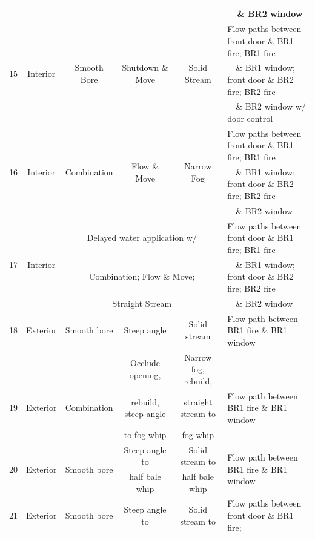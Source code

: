 \documentclass[12pt,oneside]{book}
\begin{document}
\begin{table}[!ht]
{\begin{tabular}{|c|c|c|c|c|l|}
					& 							& 								& 									& 									& ~~\& BR2 window \\
\hline
\multirow{3}{*}{15}	& \multirow{3}{*}{Interior} & \multirow{3}{*}{Smooth Bore} 	& \multirow{3}{*}{Shutdown \& Move}	& \multirow{3}{*}{Solid Stream} 	& Flow paths between front door \& BR1 fire; BR1 fire \\
					& 							& 								& 									& 									& ~~\& BR1 window; front door \& BR2 fire; BR2 fire	\\
					& 							& 								& 									& 									& ~~\& BR2 window w/ door control \\
\hline
\multirow{3}{*}{16}	& \multirow{3}{*}{Interior} & \multirow{3}{*}{Combination} 	& \multirow{3}{*}{Flow \& Move}		& \multirow{3}{*}{Narrow Fog} 		& Flow paths between front door \& BR1 fire; BR1 fire \\
					& 							& 								& 									& 									& ~~\& BR1 window; front door \& BR2 fire; BR2 fire	\\
					& 							& 								& 									& 									& ~~\& BR2 window \\
\hline
\multirow{3}{*}{17}	& \multirow{3}{*}{Interior} & \multicolumn{3}{c|}{Delayed water application w/}														& Flow paths between front door \& BR1 fire; BR1 fire \\
					& 							& \multicolumn{3}{c|}{Combination; Flow \& Move;}														& ~~\& BR1 window; front door \& BR2 fire; BR2 fire	\\
					& 							& \multicolumn{3}{c|}{Straight Stream}																	& ~~\& BR2 window \\
\hline \hline
18 					& Exterior 					& 	Smooth bore 				& Steep angle 				& 	Solid stream 			& 	Flow path between BR1 fire \& BR1 window \\
\hline
					&  							& 								& Occlude opening, 		 	&  	Narrow fog, rebuild, 		& 	\\
 		19			& 			Exterior		& 	Combination					& rebuild, steep angle   	&  	straight stream to  		& 	Flow path between BR1 fire \& BR1 window		\\
 					& 							& 								& to fog whip				& 	fog whip 					& 		\\
\hline
\multirow{2}{*}{20}	& \multirow{2}{*}{Exterior} & \multirow{2}{*}{Smooth bore} 	& Steep angle to 			&  	Solid stream to 	& 	\multirow{2}{*}{Flow path between BR1 fire \& BR1 window} 	\\
 					& 							& 								& half bale whip  			&  	half bale whip 		& 			\\
\hline \hline
\multirow{2}{*}{21}	& \multirow{2}{*}{Exterior} & \multirow{2}{*}{Smooth bore} 	& Steep angle to 			&  Solid stream to 		& Flow paths between front door \& BR1 fire; 	\\

\end{tabular}}
\end{table}
\end{document}
